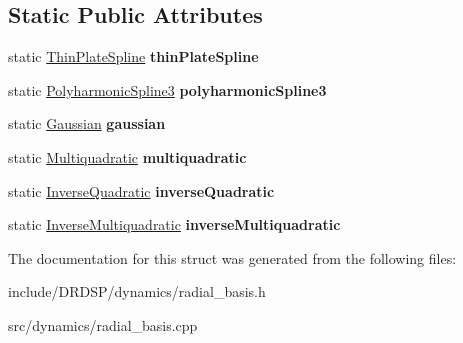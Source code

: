 \subsection*{Static Public Attributes}
\begin{DoxyCompactItemize}
\item 
\hypertarget{struct_d_r_d_s_p_1_1_radial_function_a3127a8f8bc519d3844e1411585d52f29}{static \hyperlink{struct_d_r_d_s_p_1_1_thin_plate_spline}{Thin\-Plate\-Spline} {\bfseries thin\-Plate\-Spline}}\label{struct_d_r_d_s_p_1_1_radial_function_a3127a8f8bc519d3844e1411585d52f29}

\item 
\hypertarget{struct_d_r_d_s_p_1_1_radial_function_a37de083f32f66b1cd77c0ee7e49f032f}{static \hyperlink{struct_d_r_d_s_p_1_1_polyharmonic_spline3}{Polyharmonic\-Spline3} {\bfseries polyharmonic\-Spline3}}\label{struct_d_r_d_s_p_1_1_radial_function_a37de083f32f66b1cd77c0ee7e49f032f}

\item 
\hypertarget{struct_d_r_d_s_p_1_1_radial_function_ad100a3aa9c46c4c4790162747cd5494d}{static \hyperlink{struct_d_r_d_s_p_1_1_gaussian}{Gaussian} {\bfseries gaussian}}\label{struct_d_r_d_s_p_1_1_radial_function_ad100a3aa9c46c4c4790162747cd5494d}

\item 
\hypertarget{struct_d_r_d_s_p_1_1_radial_function_aeb20eb1b47b6e68ea16e610a8d41f948}{static \hyperlink{struct_d_r_d_s_p_1_1_multiquadratic}{Multiquadratic} {\bfseries multiquadratic}}\label{struct_d_r_d_s_p_1_1_radial_function_aeb20eb1b47b6e68ea16e610a8d41f948}

\item 
\hypertarget{struct_d_r_d_s_p_1_1_radial_function_a216209cd1f401c6ce3d1b0b30e5e1cf6}{static \hyperlink{struct_d_r_d_s_p_1_1_inverse_quadratic}{Inverse\-Quadratic} {\bfseries inverse\-Quadratic}}\label{struct_d_r_d_s_p_1_1_radial_function_a216209cd1f401c6ce3d1b0b30e5e1cf6}

\item 
\hypertarget{struct_d_r_d_s_p_1_1_radial_function_a3c076d35277e84cc9bfb64035f98c28d}{static \hyperlink{struct_d_r_d_s_p_1_1_inverse_multiquadratic}{Inverse\-Multiquadratic} {\bfseries inverse\-Multiquadratic}}\label{struct_d_r_d_s_p_1_1_radial_function_a3c076d35277e84cc9bfb64035f98c28d}

\end{DoxyCompactItemize}


The documentation for this struct was generated from the following files\-:\begin{DoxyCompactItemize}
\item 
include/\-D\-R\-D\-S\-P/dynamics/radial\-\_\-basis.\-h\item 
src/dynamics/radial\-\_\-basis.\-cpp\end{DoxyCompactItemize}
